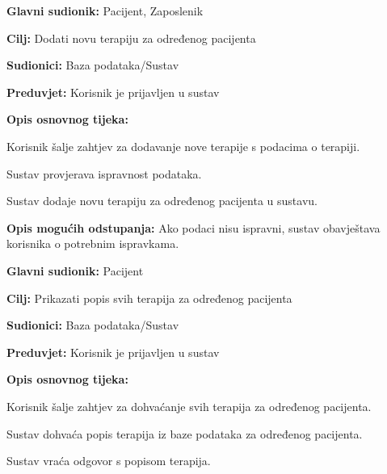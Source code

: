                 \noindent {}
					\begin{packed_item}
	
						\item \textbf{Glavni sudionik: }Pacijent, Zaposlenik
						\item  \textbf{Cilj:} Dodati novu terapiju za određenog pacijenta
						\item  \textbf{Sudionici:} Baza podataka/Sustav
						\item  \textbf{Preduvjet:} Korisnik je prijavljen u sustav
						\item  \textbf{Opis osnovnog tijeka:}
						
						\item[] \begin{packed_enum}
	
							\item Korisnik šalje zahtjev za dodavanje nove terapije s podacima o terapiji.
							\item Sustav provjerava ispravnost podataka.
                            \item Sustav dodaje novu terapiju za određenog pacijenta u sustavu.
	
						\end{packed_enum}
						
						\item  \textbf{Opis mogućih odstupanja:} Ako podaci nisu ispravni, sustav obavještava korisnika o potrebnim ispravkama.
						
						
					\end{packed_item}

                \noindent {}
					\begin{packed_item}
	
						\item \textbf{Glavni sudionik: }Pacijent
						\item  \textbf{Cilj:} Prikazati popis svih terapija za određenog pacijenta
						\item  \textbf{Sudionici:} Baza podataka/Sustav
						\item  \textbf{Preduvjet:} Korisnik je prijavljen u sustav
						\item  \textbf{Opis osnovnog tijeka:}
						
						\item[] \begin{packed_enum}
	
							\item Korisnik šalje zahtjev za dohvaćanje svih terapija za određenog pacijenta.
							\item Sustav dohvaća popis terapija iz baze podataka za određenog pacijenta.
                            \item Sustav vraća odgovor s popisom terapija.
	
						\end{packed_enum}
						
						
					\end{packed_item}

